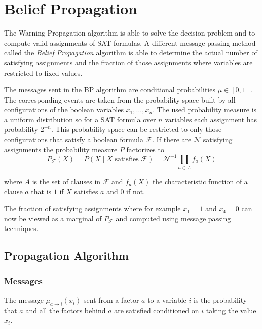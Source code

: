 \section{Belief Propagation} \label{BP}

The Warning Propagation algorithm is able to solve the decision problem and to compute valid assignments of SAT formulas. A different message passing method called the \emph{Belief Propagation} algorithm is able to determine the actual number of satisfying assignments and the fraction of those assignments where variables are restricted to fixed values. 

The messages sent in the BP algorithm are conditional probabilities $\mu \in [0, 1]$. The corresponding events are taken from the probability space built by all configurations of the  boolean variables $x_1, \ldots, x_n$. The used probability measure is a uniform distribution so for a SAT formula over $n$ variables each assignment has probability $2^{-n}$. \newline
This probability space can be restricted to only those configurations that satisfy a boolean formula $\mathcal{F}$. If there are $\mathcal{N}$ satisfying assignments the probability measure $P$ factorizes to $$P_{\mathcal{F}}(X) = P(X \; | \; X \text{ satisfies } \mathcal{F}) = \mathcal{N}^{-1} \prod_{a \in A} f_a(X)$$

where $A$ is the set of clauses in $\mathcal{F}$ and $f_a(X)$ the characteristic function of a clause $a$ that is $1$ if $X$ satisfies $a$ and $0$ if not.

The fraction of satisfying assignments where for example $x_1 = 1$ and $x_4 = 0$ can now be viewed as a marginal of $P_\mathcal{F}$ and computed using message passing techniques.

\subsection{Propagation Algorithm} \label{BPA}

\subsubsection{Messages}


The message $\mu_{a \rightarrow i}(x_i)$ sent from a factor $a$ to a variable $i$ is the probability that $a$ and all the factors behind $a$ are satisfied conditioned on $i$ taking the value $x_i$. 


